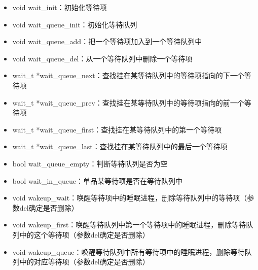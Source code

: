 \begin{itemize}
\item
  void wait\_init：初始化等待项
\item
  void wait\_queue\_init：初始化等待队列
\item
  void wait\_queue\_add：把一个等待项加入到一个等待队列中
\item
  void wait\_queue\_del：从一个等待队列中删除一个等待项
\item
  wait\_t
  *wait\_queue\_next：查找挂在某等待队列中的等待项指向的下一个等待项
\item
  wait\_t
  *wait\_queue\_prev：查找挂在某等待队列中的等待项指向的前一个等待项
\item
  wait\_t *wait\_queue\_first：查找挂在某等待队列中的第一个等待项
\item
  wait\_t *wait\_queue\_last：查找挂在某等待队列中的最后一个等待项
\item
  bool wait\_queue\_empty：判断等待队列是否为空
\item
  bool wait\_in\_queue：单品某等待项是否在等待队列中
\item
  void
  wakeup\_wait：唤醒等待项中的睡眠进程，删除等待队列中的等待项（参数del确定是否删除）
\item
  void
  wakeup\_first：唤醒等待队列中第一个等待项中的睡眠进程，删除等待队列中的这个等待项（参数del确定是否删除）
\item
  void
  wakeup\_queue：唤醒等待队列中所有等待项中的睡眠进程，删除等待队列中的对应等待项（参数del确定是否删除）
\end{itemize}
